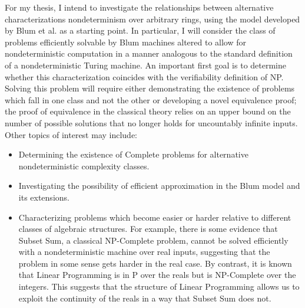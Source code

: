 \documentclass{article}
\begin{document}
\begin{spacing}{1.1}
  For my thesis, I intend to investigate the relationships between
  alternative characterizations nondeterminism over arbitrary rings,
  using the model developed by Blum et al. as a starting point.  In
  particular, I will consider the class of problems efficiently
  solvable by Blum machines altered to allow for nondeterministic
  computation in a manner analogous to the standard definition of a
  nondeterministic Turing machine.  An important first goal is to
  determine whether this characterization coincides with the
  verifiability definition of NP.  Solving this problem will require
  either demonstrating the existence of problems which fall in one
  class and not the other or developing a novel equivalence proof; the
  proof of equivalence in the classical theory relies on an upper
  bound on the number of possible solutions that no longer holds for
  uncountably infinite inputs. Other topics of interest may include:

  \begin{itemize}
  \item Determining the existence of Complete problems for alternative
    nondeterministic complexity classes.
  \item Investigating the possibility of efficient approximation in
    the Blum model and its extensions.
  \item Characterizing problems which become easier or harder relative
    to different classes of algebraic structures.  For example, there
    is some evidence that Subset Sum, a classical NP-Complete problem,
    cannot be solved efficiently with a nondeterministic machine over
    real inputs, suggesting that the problem in some sense gets harder
    in the real case.  By contrast, it is known that Linear
    Programming is in P over the reals but is NP-Complete over the
    integers. This suggests that the structure of Linear Programming
    allows us to exploit the continuity of the reals in a way that
    Subset Sum does not.
  \end{itemize}

\end{spacing}
\end{document}
